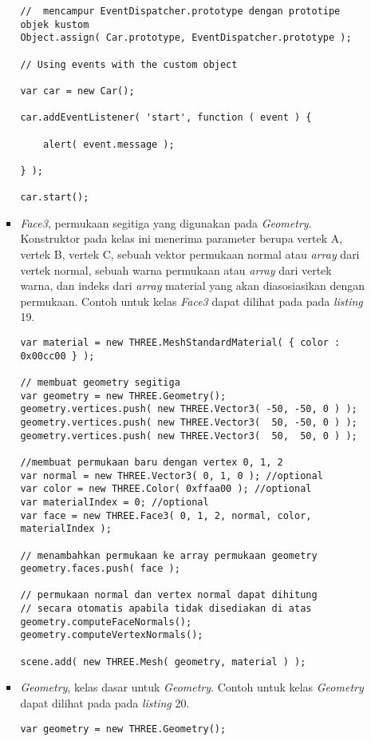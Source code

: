 \documentclass[a4paper,twoside]{article}
\begin{document}
\begin{enumerate}
\begin{itemize}
\begin{itemize}
\begin{lstlisting}[caption={Contoh penggunaan objek {\it EventDispatcher} untuk objek kustom.},captionpos=b]
//  mencampur EventDispatcher.prototype dengan prototipe objek kustom
Object.assign( Car.prototype, EventDispatcher.prototype );

// Using events with the custom object

var car = new Car();

car.addEventListener( 'start', function ( event ) {

    alert( event.message );

} );

car.start();
\end{lstlisting}

	\item{\it Face3}, permukaan segitiga yang digunakan pada {\it Geometry}. Konstruktor pada kelas ini menerima parameter berupa vertek A, vertek B, vertek C, sebuah vektor permukaan normal atau {\it array} dari vertek normal, sebuah warna permukaan atau {\it array} dari vertek warna, dan indeks dari {\it array} material yang akan diasosiasikan dengan permukaan. Contoh untuk kelas {\it Face3} dapat dilihat pada pada {\it listing} 19.
\begin{lstlisting}[caption={Contoh penggunaan {\it Face3} pada suatu {\it Geometry}.},captionpos=b]
var material = new THREE.MeshStandardMaterial( { color : 0x00cc00 } );

// membuat geometry segitiga
var geometry = new THREE.Geometry();
geometry.vertices.push( new THREE.Vector3( -50, -50, 0 ) );
geometry.vertices.push( new THREE.Vector3(  50, -50, 0 ) );
geometry.vertices.push( new THREE.Vector3(  50,  50, 0 ) );

//membuat permukaan baru dengan vertex 0, 1, 2
var normal = new THREE.Vector3( 0, 1, 0 ); //optional
var color = new THREE.Color( 0xffaa00 ); //optional
var materialIndex = 0; //optional
var face = new THREE.Face3( 0, 1, 2, normal, color, materialIndex );

// menambahkan permukaan ke array permukaan geometry
geometry.faces.push( face );

// permukaan normal dan vertex normal dapat dihitung
// secara otomatis apabila tidak disediakan di atas
geometry.computeFaceNormals();
geometry.computeVertexNormals();

scene.add( new THREE.Mesh( geometry, material ) );
\end{lstlisting}

	\item{\it Geometry}, kelas dasar untuk {\it Geometry}. Contoh untuk kelas {\it Geometry} dapat dilihat pada pada {\it listing} 20.
\begin{lstlisting}[caption={Contoh instansiasi kelas {\it Geometry}.},captionpos=b]
var geometry = new THREE.Geometry();


\end{lstlisting}
\end{itemize}
\end{itemize}
\end{enumerate}
\end{document}
